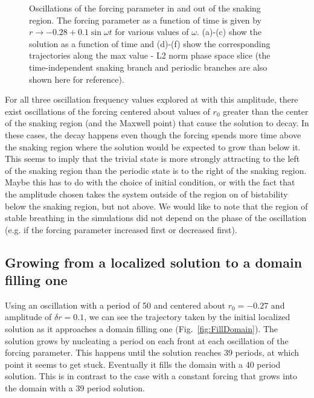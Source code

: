 \documentclass[pre,preprint,superscriptaddress]{revtex4-1}
\begin{document}
\begin{figure}[h]
\begin{center}
{}
    \caption{Oscillations of the forcing parameter in and out of the snaking region.  The forcing parameter as a function of time is given by $r\rightarrow -0.28+ 0.1\sin\omega t$ for various values of $\omega$. (a)-(c) show the solution as a function of time and (d)-(f) show the corresponding trajectories along the max value - L2 norm phase space slice (the time-independent snaking branch and periodic branches are also shown here for reference). }
    \label{fig:OscOutSnake}
  \end{center}
\end{figure}

For all three oscillation frequency values explored at with this amplitude, there exist oscillations of the forcing centered about values of $r_0$ greater than the center of the snaking region (and the Maxwell point) that cause the solution to decay.  In these cases, the decay happens even though the forcing spends more time above the snaking region where the solution would be expected to grow than below it.  This seems to imply that the trivial state is more strongly attracting to the left of the snaking region than the periodic state is to the right of the snaking region.  Maybe this has to do with the choice of initial condition, or with the fact that the amplitude chosen takes the system outside of the region on of bistability below the snaking region, but not above.  We would like to note that the region of stable breathing in the simulations did not depend on the phase of the oscillation (e.g. if the forcing parameter increased first or decreased first). 

\subsection{Growing from a localized solution to a domain filling one}
 
Using an oscillation with a period of 50 and centered about $r_0=-0.27$ and amplitude of $\delta r =0.1$, we can see the trajectory taken by the initial localized solution as it approaches a domain filling one (Fig.~\ref{fig:FillDomain}).  The solution grows by nucleating a period on each front at each oscillation of the forcing parameter. This happens until the solution reaches 39 periods, at which point it seems to get stuck.  Eventually it fills the domain with a 40 period solution.  This is in contrast to the case with a constant forcing that grows into the domain with a 39 period solution.  
\end{document}
